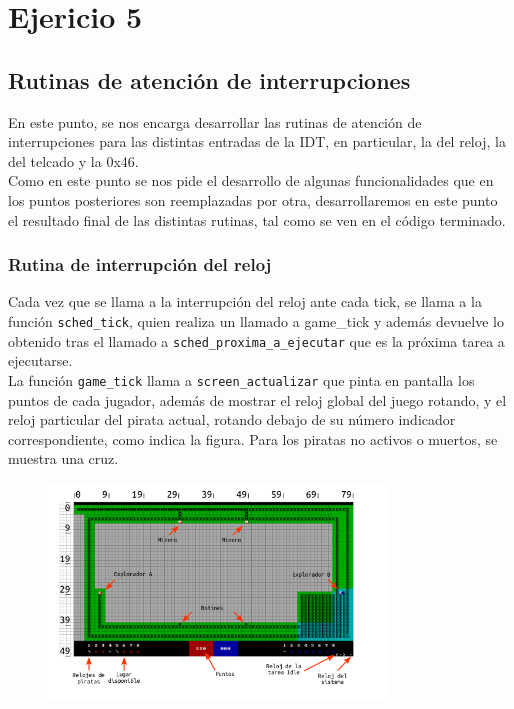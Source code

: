 \section{Ejericio 5}
\subsection{Rutinas de atención de interrupciones}

En este punto, se nos encarga desarrollar las rutinas de atención de interrupciones para las distintas entradas de la IDT, en particular, la del reloj, la del telcado y la 0x46.\\

Como en este punto se nos pide el desarrollo de algunas funcionalidades que en los puntos posteriores son reemplazadas por otra, desarrollaremos en este punto el resultado final de las distintas rutinas, tal como se ven en el código terminado.\\

\subsubsection{Rutina de interrupción del reloj}

Cada vez que se llama a la interrupción del reloj ante cada tick, se llama a la función \texttt{sched\_tick}, quien realiza un llamado a game\_tick y además devuelve lo obtenido tras el llamado a \texttt{sched\_proxima\_a\_ejecutar} que es la próxima tarea a ejecutarse.\\

La función \texttt{game\_tick} llama a \texttt{screen\_actualizar} que pinta en pantalla los puntos de cada jugador, además de mostrar el reloj global del juego rotando, y el reloj particular del pirata actual, rotando debajo de su número indicador correspondiente, como indica la figura. Para los piratas no activos o muertos, se muestra una cruz.\\


\begin{figure}[ht]
\centering
\includegraphics[width=90mm]{ej_5/img_ej_5.png}
\end{figure}


